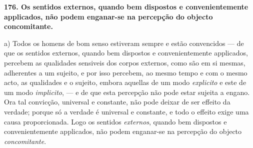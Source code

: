 \textbf{176. Os sentidos externos, quando bem dispostos e convenientemente applicados, não podem enganar-se na percepção do objecto concomitante.}

a) Todos os homens de bom senso estiveram sempre e estão convencidos --- de que os sentidos externos, quando bem dispostos e convenientemente applicados, percebem as qualidades sensiveis dos corpos externos, como são em si mesmas, adherentes a um sujeito, e por isso percebem, ao mesmo tempo e com o mesmo acto, as qualidades e o sujeito, embora aquellas de um modo \emph{explicito} e este de um modo \emph{implicito}, --- e de que esta percepção não pode estar sujeita a engano. Ora tal convicção, universal e constante, não pode deixar de ser effeito da verdade; porque só a verdade é universal e constante, e todo o effeito exige uma causa proporcionada. Logo os sentidos \emph{externos}, quando bem dispostos e convenientemente applicados, não podem enganar-se na percepção do objecto \emph{concomitante}.

